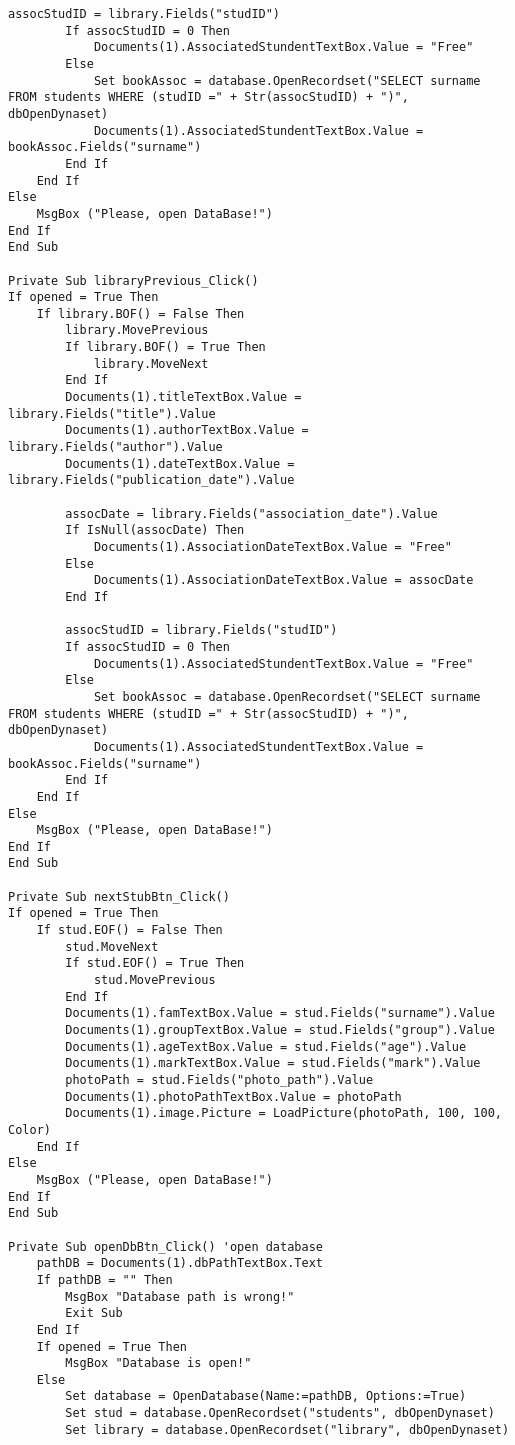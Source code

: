 \begin{lstlisting}[caption=VBA code]
        assocStudID = library.Fields("studID")
        If assocStudID = 0 Then
            Documents(1).AssociatedStundentTextBox.Value = "Free"
        Else
            Set bookAssoc = database.OpenRecordset("SELECT surname FROM students WHERE (studID =" + Str(assocStudID) + ")", dbOpenDynaset)
            Documents(1).AssociatedStundentTextBox.Value = bookAssoc.Fields("surname")
        End If
    End If
Else
    MsgBox ("Please, open DataBase!")
End If
End Sub

Private Sub libraryPrevious_Click() 
If opened = True Then
    If library.BOF() = False Then
        library.MovePrevious
        If library.BOF() = True Then
            library.MoveNext
        End If
        Documents(1).titleTextBox.Value = library.Fields("title").Value
        Documents(1).authorTextBox.Value = library.Fields("author").Value
        Documents(1).dateTextBox.Value = library.Fields("publication_date").Value
        
        assocDate = library.Fields("association_date").Value
        If IsNull(assocDate) Then
            Documents(1).AssociationDateTextBox.Value = "Free"
        Else
            Documents(1).AssociationDateTextBox.Value = assocDate
        End If
        
        assocStudID = library.Fields("studID")
        If assocStudID = 0 Then
            Documents(1).AssociatedStundentTextBox.Value = "Free"
        Else
            Set bookAssoc = database.OpenRecordset("SELECT surname FROM students WHERE (studID =" + Str(assocStudID) + ")", dbOpenDynaset)
            Documents(1).AssociatedStundentTextBox.Value = bookAssoc.Fields("surname")
        End If
    End If
Else
    MsgBox ("Please, open DataBase!")
End If
End Sub

Private Sub nextStubBtn_Click() 
If opened = True Then
    If stud.EOF() = False Then
        stud.MoveNext
        If stud.EOF() = True Then
            stud.MovePrevious
        End If
        Documents(1).famTextBox.Value = stud.Fields("surname").Value
        Documents(1).groupTextBox.Value = stud.Fields("group").Value
        Documents(1).ageTextBox.Value = stud.Fields("age").Value
        Documents(1).markTextBox.Value = stud.Fields("mark").Value
        photoPath = stud.Fields("photo_path").Value
        Documents(1).photoPathTextBox.Value = photoPath
        Documents(1).image.Picture = LoadPicture(photoPath, 100, 100, Color)
    End If
Else
    MsgBox ("Please, open DataBase!")
End If
End Sub

Private Sub openDbBtn_Click() 'open database
    pathDB = Documents(1).dbPathTextBox.Text
    If pathDB = "" Then
        MsgBox "Database path is wrong!"
        Exit Sub
    End If
    If opened = True Then
        MsgBox "Database is open!"
    Else
        Set database = OpenDatabase(Name:=pathDB, Options:=True)
        Set stud = database.OpenRecordset("students", dbOpenDynaset)
        Set library = database.OpenRecordset("library", dbOpenDynaset)
        

\end{lstlisting}
